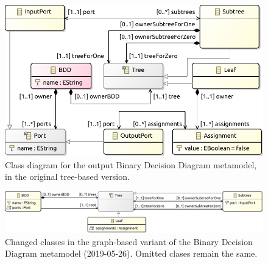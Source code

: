\documentclass[a4paper]{article}
\begin{document}
\begin{figure}[t]
  \centering
  \includegraphics[width=.6\textwidth]{bdd-class-diagram-v2}
  \caption{Class diagram for the output Binary Decision Diagram metamodel, in the original tree-based version.}
  \label{fig:bdd-metamodel}
\end{figure}

\begin{figure}[t]
  \centering
  \includegraphics[width=.9\textwidth]{bddg-class-diagram-v2}
  \caption{Changed classes in the graph-based variant of the Binary Decision Diagram metamodel (2019-05-26). Omitted clases remain the same.}
  \label{fig:bddg-metamodel}
\end{figure}
\end{document}
